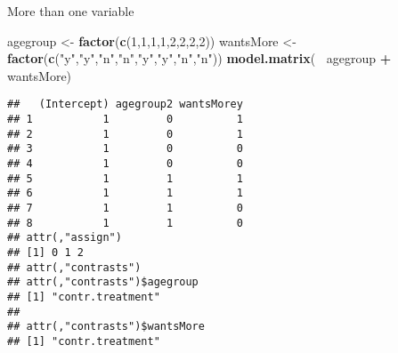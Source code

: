 \documentclass[
  ignorenonframetext,
]{beamer}
\newenvironment{Shaded}{\begin{snugshade}}{\end{snugshade}}
\newcommand{\DecValTok}[1]{\textcolor[rgb]{0.00,0.00,0.81}{#1}}
\newcommand{\KeywordTok}[1]{\textcolor[rgb]{0.13,0.29,0.53}{\textbf{#1}}}
\newcommand{\NormalTok}[1]{#1}
\newcommand{\OperatorTok}[1]{\textcolor[rgb]{0.81,0.36,0.00}{\textbf{#1}}}
\newcommand{\StringTok}[1]{\textcolor[rgb]{0.31,0.60,0.02}{#1}}
\begin{document}
\begin{frame}[fragile]{More than one variable}
\protect\hypertarget{more-than-one-variable}{}

\tiny

\begin{Shaded}
\begin{Highlighting}[]
\NormalTok{agegroup <-}\StringTok{ }\KeywordTok{factor}\NormalTok{(}\KeywordTok{c}\NormalTok{(}\DecValTok{1}\NormalTok{,}\DecValTok{1}\NormalTok{,}\DecValTok{1}\NormalTok{,}\DecValTok{1}\NormalTok{,}\DecValTok{2}\NormalTok{,}\DecValTok{2}\NormalTok{,}\DecValTok{2}\NormalTok{,}\DecValTok{2}\NormalTok{))}
\NormalTok{wantsMore <-}\StringTok{ }\KeywordTok{factor}\NormalTok{(}\KeywordTok{c}\NormalTok{(}\StringTok{"y"}\NormalTok{,}\StringTok{"y"}\NormalTok{,}\StringTok{"n"}\NormalTok{,}\StringTok{"n"}\NormalTok{,}\StringTok{"y"}\NormalTok{,}\StringTok{"y"}\NormalTok{,}\StringTok{"n"}\NormalTok{,}\StringTok{"n"}\NormalTok{))}
\KeywordTok{model.matrix}\NormalTok{(}\OperatorTok{~}\StringTok{ }\NormalTok{agegroup }\OperatorTok{+}\StringTok{ }\NormalTok{wantsMore)}
\end{Highlighting}
\end{Shaded}

\begin{verbatim}
##   (Intercept) agegroup2 wantsMorey
## 1           1         0          1
## 2           1         0          1
## 3           1         0          0
## 4           1         0          0
## 5           1         1          1
## 6           1         1          1
## 7           1         1          0
## 8           1         1          0
## attr(,"assign")
## [1] 0 1 2
## attr(,"contrasts")
## attr(,"contrasts")$agegroup
## [1] "contr.treatment"
## 
## attr(,"contrasts")$wantsMore
## [1] "contr.treatment"
\end{verbatim}

\end{frame}
\end{document}
